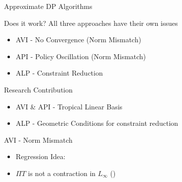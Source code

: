 \documentclass[10pt]{beamer}
\begin{document}
\begin{frame}[fragile]{Approximate DP Algorithms}

\begin{block}{Does it work?}
All three approaches have their own issues
\begin{itemize}
\item AVI  - No Convergence (Norm Mismatch)
\item API  - Policy Oscillation (Norm Mismatch)
\item ALP  - Constraint Reduction
\end{itemize}
\end{block}

\begin{block}{Research Contribution}
\begin{itemize}
\item AVI \& API - Tropical Linear Basis
\item ALP  - Geometric Conditions for constraint reduction
\end{itemize}
\end{block}



\end{frame}


\begin{frame}[fragile]{AVI - Norm Mismatch}
\begin{algorithm}[H]
\caption*{Approximate Value Iteration {}}
\begin{algorithmic}[1]
\STATE{\}}
\end{algorithmic}
\end{algorithm}

\begin{itemize}
\item Regression Idea: {}
\item $\Pi T$ is not a contraction in $L_\infty$ ({\color{orange}{No fixed point}})
\end{itemize}
\end{frame}
\end{document}

